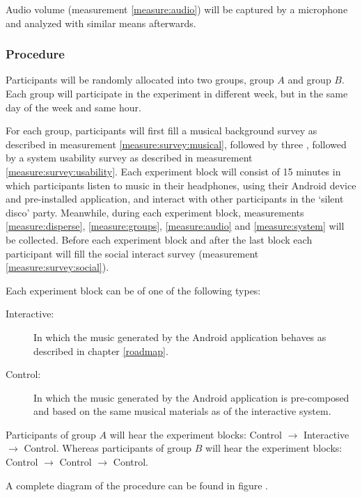 Audio volume (measurement \ref{measure:audio}) will be captured by a microphone and analyzed with similar means afterwards.

\subsubsection{Procedure}

Participants will be randomly allocated into two groups, group $A$ and group $B$\@. Each group will participate in the experiment in different week, but in the same day of the week and same hour.

For each group, participants will first fill a musical background survey as described in measurement \ref{measure:survey:musical}, followed by three , followed by a system usability survey as described in measurement \ref{measure:survey:usability}. Each experiment block will consist of 15 minutes in which participants listen to music in their headphones, using their Android device and pre-installed application, and interact with other participants in the `silent disco' party. Meanwhile, during each experiment block, measurements \ref{measure:disperse}, \ref{measure:groups}, \ref{measure:audio} and \ref{measure:system} will be collected. Before each experiment block and after the last block each participant will fill the social interact survey (measurement \ref{measure:survey:social}).

Each experiment block can be of one of the following types:
\begin{description}
	\item[Interactive:] In which the music generated by the Android application behaves as described in chapter \ref{roadmap}.
	\item[Control:] In which the music generated by the Android application is pre-composed and based on the same musical materials as of the interactive system.
\end{description}

Participants of group $A$ will hear the experiment blocks: Control $\rightarrow$ Interactive $\rightarrow$ Control. Whereas participants of group $B$ will hear the experiment blocks: Control $\rightarrow$ Control $\rightarrow$ Control.

A complete diagram of the procedure can be found in figure .
